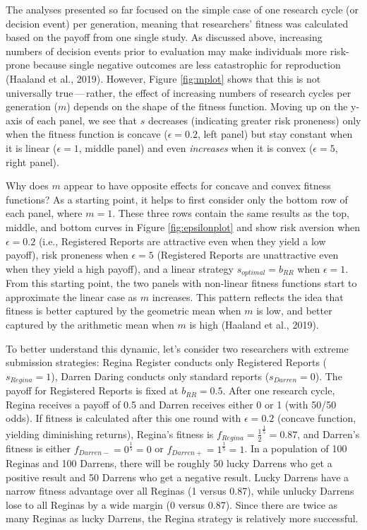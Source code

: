 \documentclass[
  ,man,mask,floatsintext]{apa6}
\begin{document}
The analyses presented so far focused on the simple case of one research cycle (or decision event) per generation, meaning that researchers' fitness was calculated based on the payoff from one single study.
As discussed above, increasing numbers of decision events prior to evaluation may make individuals more risk-prone because single negative outcomes are less catastrophic for reproduction (Haaland et al., 2019).
However, Figure \ref{fig:mplot} shows that this is not universally true\(\,\)---\(\,\)rather, the effect of increasing numbers of research cycles per generation (\(m\)) depends on the shape of the fitness function.
Moving up on the y-axis of each panel, we see that \(s\) decreases (indicating greater risk proneness) only when the fitness function is concave (\(\epsilon = 0.2\), left panel) but stay constant when it is linear (\(\epsilon = 1\), middle panel) and even \emph{increases} when it is convex (\(\epsilon = 5\), right panel).

Why does \(m\) appear to have opposite effects for concave and convex fitness functions?
As a starting point, it helps to first consider only the bottom row of each panel, where \(m = 1\).
These three rows contain the same results as the top, middle, and bottom curves in Figure \ref{fig:epsilonplot} and show risk aversion when \(\epsilon = 0.2\) (i.e., Registered Reports are attractive even when they yield a low payoff), risk proneness when \(\epsilon = 5\) (Registered Reports are unattractive even when they yield a high payoff), and a linear strategy \(s_{optimal} = b_{RR}\) when \(\epsilon = 1\).
From this starting point, the two panels with non-linear fitness functions start to approximate the linear case as \(m\) increases.
This pattern reflects the idea that fitness is better captured by the geometric mean when \(m\) is low, and better captured by the arithmetic mean when \(m\) is high (Haaland et al., 2019).

To better understand this dynamic, let's consider two researchers with extreme submission strategies:
Regina Register conducts only Registered Reports (\(s_{Regina} = 1\)), Darren Daring conducts only standard reports (\(s_{Darren} = 0\)).
The payoff for Registered Reports is fixed at \(b_{RR} = 0.5\).
After one research cycle, Regina receives a payoff of 0.5 and Darren receives either 0 or 1 (with 50/50 odds).
If fitness is calculated after this one round with \(\epsilon = 0.2\) (concave function, yielding diminishing returns), Regina's fitness is \(f_{Regina} = \frac{1}{2}^{\frac{1}{5}} = 0.87\), and Darren's fitness is either \(f_{Darren-} = 0^{\frac{1}{5}} = 0\) or \(f_{Darren+} = 1^{\frac{1}{5}} = 1\).
In a population of 100 Reginas and 100 Darrens, there will be roughly 50 lucky Darrens who get a positive result and 50 Darrens who get a negative result.
Lucky Darrens have a narrow fitness advantage over all Reginas (1 versus 0.87), while unlucky Darrens lose to all Reginas by a wide margin (0 versus 0.87).
Since there are twice as many Reginas as lucky Darrens, the Regina strategy is relatively more successful.
\end{document}
